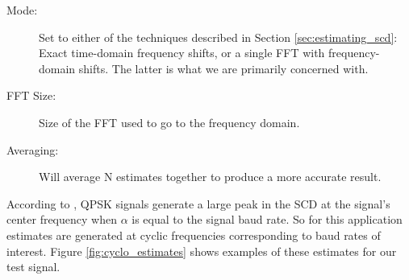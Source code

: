 \documentclass[12pt]{report}
\begin{document}
\begin{description}
    \item[Mode:] Set to either of the techniques described in Section
    \ref{sec:estimating_scd}: Exact time-domain frequency shifts, or a single
    FFT with frequency-domain shifts. The latter is what we are primarily concerned
    with.
    \item[FFT Size:]Size of the FFT used to go to the frequency domain.
    \item[Averaging:]Will average N estimates together to produce a more accurate
    result.
\end{description}

According to \cite{Gardner2}, QPSK signals generate a large peak in the SCD at
the signal's center frequency when $\alpha$ is equal to the signal baud rate.
So for this application estimates are generated at cyclic frequencies
corresponding to baud rates of interest. Figure \ref{fig:cyclo_estimates} shows
examples of these estimates for our test signal.
\end{document}
